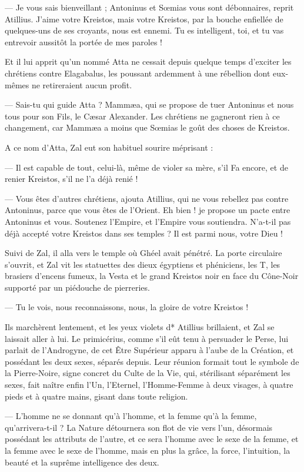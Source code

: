 \documentclass[a4paper, 11pt, oneside, polutonikogreek, french]{article}
\begin{document}
--- Je vous sais bienveillant ; Antoninus et Sœmias vous sont débonnaires, reprit Atillius. J'aime votre Kreistos, mais votre Kreistos, par la bouche enfiellée de quelques-uns de ses croyants, nous est ennemi. Tu es intelligent, toi, et tu vas entrevoir aussitôt la portée de mes paroles !

Et il lui apprit qu'un nommé Atta ne cessait depuis quelque temps d'exciter les chrétiens contre Elagabalus, les poussant ardemment à une rébellion dont eux-mêmes ne retireraient aucun profit.

--- Sais-tu qui guide Atta ? Mammæa, qui se propose de tuer Antoninus et nous tous pour son Fils, le Cæsar Alexander. Les chrétiens ne gagneront rien à ce changement, car Mammæa a moins que Sœmias le goût des choses de Kreistos.

A ce nom d'Atta, Zal eut son habituel sourire méprisant :

--- Il est capable de tout, celui-là, même de violer sa mère, s'il Fa encore, et de renier Kreistos, s'il ne l'a déjà renié !

--- Vous êtes d'autres chrétiens, ajouta Atillius, qui ne vous rebellez pas contre Antoninus, parce que vous êtes de l'Orient. Eh bien ! je propose un pacte entre Antoninus et vous. Soutenez l'Empire, et l'Empire vous soutiendra. N'a-t-il pas déjà accepté votre Kreistos dans ses temples ? Il est parmi nous, votre Dieu !

Suivi de Zal, il alla vers le temple où Ghéel avait pénétré. La porte circulaire s'ouvrit, et Zal vit les statuettes des dieux égyptiens et phéniciens, les T, les brasiers d'encens fumeux, la Vesta et le grand Kreistos noir en face du Cône-Noir supporté par un piédouche de pierreries.

--- Tu le vois, nous reconnaissons, nous, la gloire de votre Kreistos !

Ils marchèrent lentement, et les yeux violets d* Atillius brillaient, et Zal se laissait aller à lui. Le primicérius, comme s'il eût tenu à persuader le Perse, lui parlait de l'Androgyne, de cet Être Supérieur apparu à l'aube de la Création, et possédant les deux sexes, séparés depuis. Leur réunion formait tout le symbole de la Pierre-Noire, signe concret du Culte de la Vie, qui, stérilisant séparément les sexes, fait naître enfin l'Un, l'Eternel, l'Homme-Femme à deux visages, à quatre pieds et à quatre mains, gisant dans toute religion.

--- L'homme ne se donnant qu'à l'homme, et la femme qu'à la femme, qu'arrivera-t-il ? La Nature détournera son flot de vie vers l'un, désormais possédant les attributs de l'autre, et ce sera l'homme avec le sexe de la femme, et la femme avec le sexe de l'homme, mais en plus la grâce, la force, l'intuition, la beauté et la suprême intelligence des deux.
\end{document}

